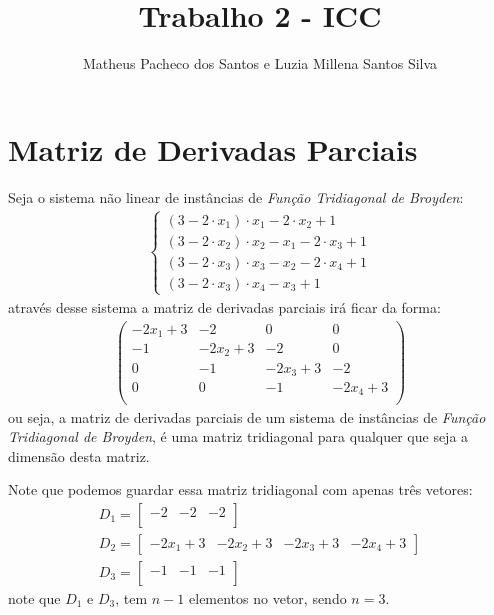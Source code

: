 \documentclass[10pt,a4paper]{article}
\author{Matheus Pacheco dos Santos e Luzia Millena Santos Silva}
\title{Trabalho 2 - ICC}
\begin{document}
	\maketitle
	
	\section{Matriz de Derivadas Parciais}
	Seja o sistema não linear de instâncias de \textit{Função Tridiagonal de Broyden}:
	\begin{align*}
		\begin{cases}
			(3-2\cdot x_{1})\cdot x_{1}-2\cdot x_{2}+1 \\
			(3-2\cdot x_{2})\cdot x_{2}-x_{1}-2 \cdot x_{3}+1 \\
			(3-2\cdot x_{3})\cdot x_{3}-x_{2} -2 \cdot x_{4} + 1 \\
			(3-2\cdot x_{3})\cdot x_{4}-x_{3} + 1 
		\end{cases}
	\end{align*}
	através desse sistema a matriz de derivadas parciais irá ficar da forma:
	\begin{align*}
		\begin{pmatrix}
			-2x_{1} + 3 & -2 & 0 & 0 \\
			-1 & - 2x_{2} + 3 & - 2 & 0 \\
			0 & - 1 & - 2x_{3} + 3 & -2 \\
			0 & 0 & - 1 & - 2x_{4} + 3 \\
		\end{pmatrix}
	\end{align*}
	ou seja, a matriz de derivadas parciais de um sistema de instâncias de \textit{Função Tridiagonal de Broyden}, é uma matriz tridiagonal para qualquer que seja a dimensão desta matriz. 
	
	Note que podemos guardar essa matriz tridiagonal com apenas três vetores:
	\begin{align*}
		& D_{1} = 
		\begin{bmatrix}
		 -2 & -2  & -2 \\
		\end{bmatrix} & \\
		& D_{2} = 
		\begin{bmatrix}
			-2x_{1} + 3 & - 2x_{2} + 3 & - 2x_{3} + 3 & - 2x_{4} + 3
		\end{bmatrix} & \\
		& D_{3} = 
		\begin{bmatrix}
		-1 & -1  & -1 \\
		\end{bmatrix} & 
	\end{align*}
	note que $ D_{1} $ e $ D_{3} $, tem $ n - 1 $ elementos no vetor, sendo $ n = 3 $.
	
\end{document}
